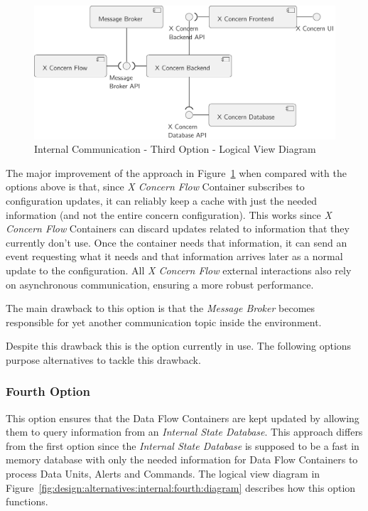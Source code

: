 \begin{figure}[H]
   \centering
   \includegraphics[page=1,width=0.8\columnwidth]{assets/diagrams/design/alternatives/internal/alternative3.pdf}
   \caption[Internal Communication - Third Option - Logical View Diagram]{Internal Communication - Third Option - Logical View Diagram}
   \label{fig:design:alternatives:internal:third:diagram}
\end{figure}

The major improvement of the approach in Figure~\ref{fig:design:alternatives:internal:third:diagram} when compared with the options above is that, since \textit{X Concern Flow} Container subscribes to configuration updates, it can reliably keep a cache with just the needed information (and not the entire concern configuration). This works since \textit{X Concern Flow} Containers can discard updates related to information that they currently don't use. Once the container needs that information, it can send an event requesting what it needs and that information arrives later as a normal update to the configuration.
All \textit{X Concern Flow} external interactions also rely on asynchronous communication, ensuring a more robust performance.

The main drawback to this option is that the \textit{Message Broker} becomes responsible for yet another communication topic inside the environment.

Despite this drawback this is the option currently in use. The following options purpose alternatives to tackle this drawback.

\subsubsection{Fourth Option}
\label{subsubsec:design:alternatives:internal:fourth}

This option ensures that the Data Flow Containers are kept updated by allowing them to query information from an \textit{Internal State Database}. This approach differs from the first option since the \textit{Internal State Database} is supposed to be a fast in memory database with only the needed information for Data Flow Containers to process Data Units, Alerts and Commands. The logical view diagram in Figure~\ref{fig:design:alternatives:internal:fourth:diagram} describes how this option functions.

